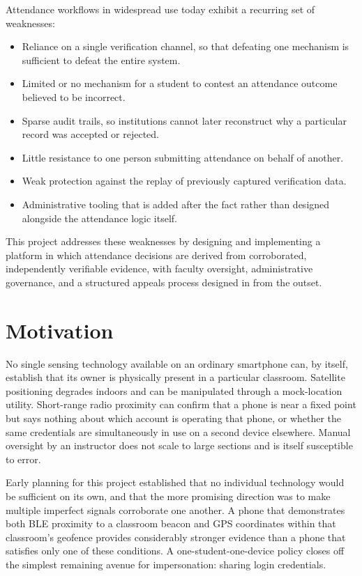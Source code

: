\documentclass[12pt, a4paper, oneside]{report}
\begin{document}
Attendance workflows in widespread use today exhibit a recurring set of weaknesses:

\begin{itemize}
    \item Reliance on a single verification channel, so that defeating one mechanism is sufficient to defeat the entire system.
    \item Limited or no mechanism for a student to contest an attendance outcome believed to be incorrect.
    \item Sparse audit trails, so institutions cannot later reconstruct why a particular record was accepted or rejected.
    \item Little resistance to one person submitting attendance on behalf of another.
    \item Weak protection against the replay of previously captured verification data.
    \item Administrative tooling that is added after the fact rather than designed alongside the attendance logic itself.
\end{itemize}

This project addresses these weaknesses by designing and implementing a platform in which attendance decisions are derived from corroborated, independently verifiable evidence, with faculty oversight, administrative governance, and a structured appeals process designed in from the outset.

\section{Motivation}
\label{sec:motivation}

No single sensing technology available on an ordinary smartphone can, by itself, establish that its owner is physically present in a particular classroom. Satellite positioning degrades indoors and can be manipulated through a mock-location utility. Short-range radio proximity can confirm that a phone is near a fixed point but says nothing about which account is operating that phone, or whether the same credentials are simultaneously in use on a second device elsewhere. Manual oversight by an instructor does not scale to large sections and is itself susceptible to error.

Early planning for this project established that no individual technology would be sufficient on its own, and that the more promising direction was to make multiple imperfect signals corroborate one another. A phone that demonstrates both BLE proximity to a classroom beacon and GPS coordinates within that classroom's geofence provides considerably stronger evidence than a phone that satisfies only one of these conditions. A one-student-one-device policy closes off the simplest remaining avenue for impersonation: sharing login credentials.
\end{document}
